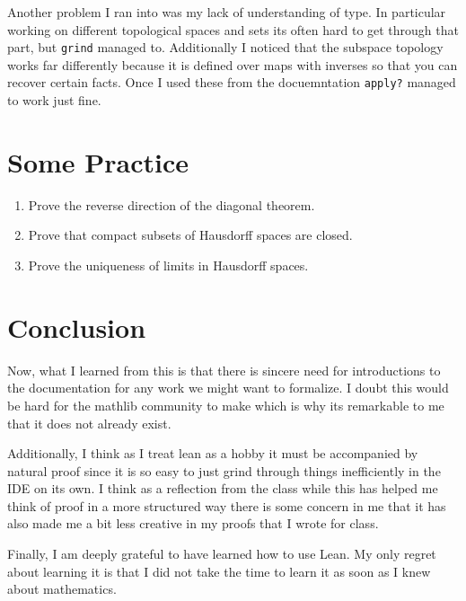 \documentclass[11pt]{article}
\begin{document}
Another problem I ran into was my lack of understanding of type. In particular working on different topological spaces and sets its often hard to get through that part, but \verb|grind| managed to. Additionally I noticed that the subspace topology works far differently because it is defined over maps with inverses so that you can recover certain facts. Once I used these from the docuemntation \verb|apply?| managed to work just fine. 

\section{Some Practice}

\begin{enumerate}
  \item Prove the reverse direction of the diagonal theorem.
  \item Prove that compact subsets of Hausdorff spaces are closed.
  \item Prove the uniqueness of limits in Hausdorff spaces.
\end{enumerate}

\section{Conclusion}

Now, what I learned from this is that there is sincere need for introductions to the documentation for any work we might want to formalize. I doubt this would be hard for the mathlib community to make which is why its remarkable to me that it does not already exist. 

Additionally, I think as I treat lean as a hobby it must be accompanied by natural proof since it is so easy to just grind through things inefficiently in the IDE on its own. I think as a reflection from the class while this has helped me think of proof in a more structured way there is some concern in me that it has also made me a bit less creative in my proofs that I wrote for class. 

Finally, I am deeply grateful to have learned how to use Lean. My only regret about learning it is that I did not take the time to learn it as soon as I knew about mathematics.
\end{document}
